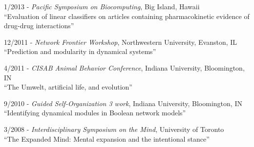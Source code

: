 \documentclass[margin,line,centered]{res}
\begin{document}
\begin{resume}
1/2013 - \emph{Pacific Symposium on Biocomputing}, Big Island, Hawaii\\
``Evaluation of linear classifiers on articles containing pharmacokinetic evidence
 of drug-drug interactions'' %


12/2011 - \emph{Network Frontier Workshop}, Northwestern University, Evanston, IL\\
``Prediction and modularity in dynamical systems''


4/2011 - %
\emph{CISAB Animal Behavior Conference}, Indiana University, Bloomington, IN\\
``The Umwelt, artificial life, and evolution''

9/2010 - \emph{Guided Self-Organization 3 work}, Indiana University, Bloomington, IN\\
``Identifying dynamical modules in Boolean network models''

3/2008 - \emph{Interdisciplinary Symposium on the Mind}, University of Toronto\\
``The Expanded Mind: Mental expansion and the intentional stance''







\end{resume}
\end{document}
